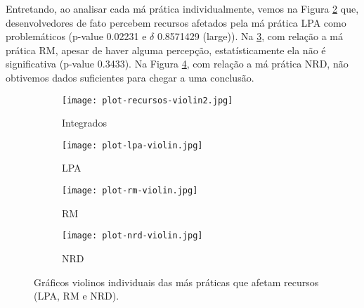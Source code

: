Entretando, ao analisar cada má prática individualmente, vemos na Figura \ref{fig:lpa} que, desenvolvedores de fato percebem recursos afetados pela má prática LPA como problemáticos (p-value 0.02231 e $\delta$ 0.8571429 (large)). Na \ref{fig:rm}, com relação a má prática RM, apesar de haver alguma percepção, estatísticamente ela não é significativa (p-value 0.3433). Na Figura \ref{fig:nrd}, com relação a má prática NRD, não obtivemos dados suficientes para chegar a uma conclusão. 

\begin{figure*}
\centering
\begin{subfigure}{.23\textwidth}
  \centering
  \texttt{[image: plot-recursos-violin2.jpg]}
  \caption{Integrados}
  \label{fig:resources}
\end{subfigure}%
\begin{subfigure}{.23\textwidth}
  \centering
  \texttt{[image: plot-lpa-violin.jpg]}
  \caption{LPA}
  \label{fig:lpa}
\end{subfigure}%
\begin{subfigure}{.23\textwidth}
  \centering
  \texttt{[image: plot-rm-violin.jpg]}
  \caption{RM}
  \label{fig:rm}
\end{subfigure}
\begin{subfigure}{.23\textwidth}
  \centering
  \texttt{[image: plot-nrd-violin.jpg]}
  \caption{NRD}
  \label{fig:nrd}
\end{subfigure}%
\caption{Gráficos violinos individuais das más práticas que afetam recursos (LPA, RM e NRD).}
\label{fig:all-resources}
\end{figure*}











